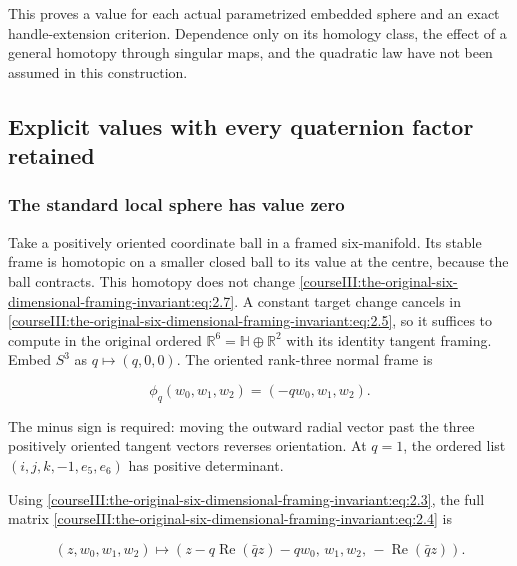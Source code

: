 This proves a value for each actual parametrized embedded sphere and an exact handle-extension criterion. Dependence only on its homology class, the effect of a general homotopy through singular maps, and the quadratic law have not been assumed in this construction.

\subsection{Explicit values with every quaternion factor retained}
\label{courseIII:the-original-six-dimensional-framing-invariant:framed-six-original-values}

\label{courseIII:the-original-six-dimensional-framing-invariant:section-3}\label{courseIII:framed6:3}

\subsubsection{The standard local sphere has value zero}
\label{courseIII:the-original-six-dimensional-framing-invariant:section-3.1}

Take a positively oriented coordinate ball in a framed six-manifold. Its stable frame is homotopic on a smaller closed ball to its value at the centre, because the ball contracts. This homotopy does not change \eqref{courseIII:the-original-six-dimensional-framing-invariant:eq:2.7}. A constant target change cancels in \eqref{courseIII:the-original-six-dimensional-framing-invariant:eq:2.5}, so it suffices to compute in the original ordered \(\mathbb R^6=\mathbb H\oplus\mathbb R^2\) with its identity tangent framing. Embed \(S^3\) as \(q\mapsto(q,0,0)\). The oriented rank-three normal frame is

\begin{equation}
\phi_q(w_0,w_1,w_2)=(-q w_0,w_1,w_2).
 \label{courseIII:the-original-six-dimensional-framing-invariant:eq:3.1}
\end{equation}

The minus sign is required: moving the outward radial vector past the three positively oriented tangent vectors reverses orientation. At \(q=1\), the ordered list \((i,j,k,-1,e_5,e_6)\) has positive determinant.

Using \eqref{courseIII:the-original-six-dimensional-framing-invariant:eq:2.3}, the full matrix \eqref{courseIII:the-original-six-dimensional-framing-invariant:eq:2.4} is

\begin{equation}
(z,w_0,w_1,w_2)\longmapsto
 (z-q\operatorname{Re}(\bar qz)-qw_0,\,
    w_1,w_2,\,-\operatorname{Re}(\bar qz)).
 \label{courseIII:the-original-six-dimensional-framing-invariant:eq:3.2}
\end{equation}

